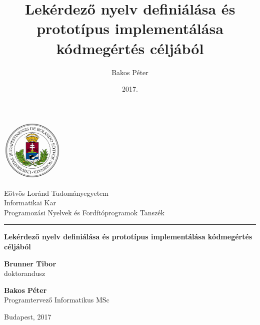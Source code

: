 \documentclass[a4paper,12pt]{report}
\title { Lekérdező nyelv definiálása és prototípus implementálása kódmegértés céljából }
\author { Bakos Péter }
\date { 2017. }
\begin{document}
\begin{titlepage}
	
	\begin{minipage}{0.40\linewidth}
		\includegraphics[width=30mm,keepaspectratio]{ELTE_logo.png}
	\end{minipage}
	\begin{minipage}{0.50\linewidth}
		\begin{center}
			Eötvös Loránd Tudományegyetem \\
			Informatikai Kar \\
			Programozási Nyelvek és Fordítóprogramok Tanszék
		\end{center}
	\end{minipage}
	
	\hrule
	\vfill
	
	\begin{center}
		\Huge
		\textbf{Lekérdező nyelv definiálása és prototípus implementálása kódmegértés céljából}
		\normalsize
	\end{center}
	
	\vfill
	
	\begin{minipage}[t]{0.5\linewidth}
		\begin{flushleft}
			\textbf{Brunner Tibor} \\
			doktorandusz
		\end{flushleft}
	\end{minipage}
	\begin{minipage}[t]{0.5\linewidth}
		\begin{flushright}
			\textbf{Bakos Péter} \\
			Programtervező Informatikus MSc
		\end{flushright}
	\end{minipage}
	
	\vfill
	
	\begin{center}
		Budapest, 2017
	\end{center}
	
\end{titlepage}

\tableofcontents
\end{document}

